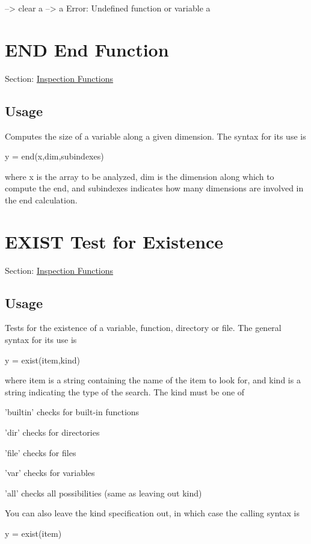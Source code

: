 \begin{DoxyVerbInclude}
--> clear a
--> a
Error: Undefined function or variable a
\end{DoxyVerbInclude}
 \hypertarget{inspection_end}{}\section{E\-N\-D End Function}\label{inspection_end}
Section\-: \hyperlink{sec_inspection}{Inspection Functions} \hypertarget{vtkwidgets_vtkxyplotwidget_Usage}{}\subsection{Usage}\label{vtkwidgets_vtkxyplotwidget_Usage}
Computes the size of a variable along a given dimension. The syntax for its use is \begin{DoxyVerb}   y = end(x,dim,subindexes)
\end{DoxyVerb}
 where {\ttfamily x} is the array to be analyzed, {\ttfamily dim} is the dimension along which to compute the end, and {\ttfamily subindexes} indicates how many dimensions are involved in the {\ttfamily end} calculation. \hypertarget{inspection_exist}{}\section{E\-X\-I\-S\-T Test for Existence}\label{inspection_exist}
Section\-: \hyperlink{sec_inspection}{Inspection Functions} \hypertarget{vtkwidgets_vtkxyplotwidget_Usage}{}\subsection{Usage}\label{vtkwidgets_vtkxyplotwidget_Usage}
Tests for the existence of a variable, function, directory or file. The general syntax for its use is \begin{DoxyVerb}  y = exist(item,kind)
\end{DoxyVerb}
 where {\ttfamily item} is a string containing the name of the item to look for, and {\ttfamily kind} is a string indicating the type of the search. The {\ttfamily kind} must be one of 
\begin{DoxyItemize}
\item {\ttfamily 'builtin'} checks for built-\/in functions  
\item {\ttfamily 'dir'} checks for directories  
\item {\ttfamily 'file'} checks for files  
\item {\ttfamily 'var'} checks for variables  
\item {\ttfamily 'all'} checks all possibilities (same as leaving out {\ttfamily kind})  
\end{DoxyItemize}You can also leave the {\ttfamily kind} specification out, in which case the calling syntax is \begin{DoxyVerb}  y = exist(item)
\end{DoxyVerb}
